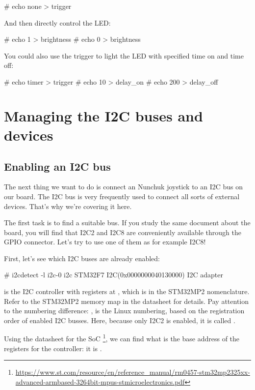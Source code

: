 {\begin{bashinput}
# echo none > trigger
\end{bashinput}

And then directly control the LED:

\begin{bashinput}
# echo 1 > brightness
# echo 0 > brightness
\end{bashinput}

You could also use the  trigger to light the LED
with specified time on and time off:

\begin{bashinput}
# echo timer > trigger
# echo 10 > delay_on
# echo 200 > delay_off
\end{bashinput}

\section{Managing the I2C buses and devices}

\subsection{Enabling an I2C bus}

The next thing we want to do is connect an Nunchuk joystick
to an I2C bus on our board. The I2C bus is very frequently used
to connect all sorts of external devices. That's why we're covering
it here.

The first task is to find a suitable bus. If you study the
same document about the board, you will find that I2C2 and I2C8 are
conveniently available through the GPIO connector. Let's try
to use one of them as for example I2C8!

First, let's see which I2C buses are already enabled:

\begin{bashinput}
# i2cdetect -l
i2c-0   i2c             STM32F7 I2C(0x0000000040130000)         I2C adapter
\end{bashinput}

 is the I2C controller with registers at
, which is  in the STM32MP2
nomenclature. Refer to the STM32MP2 memory map in the datasheet for
details. Pay attention to the numbering difference: ,
is the Linux numbering, based on the registration order
of enabled I2C busses. Here, because only I2C2 is enabled,
it is called .

Using the datasheet for the SoC
\footnote{\url{https://www.st.com/resource/en/reference_manual/rm0457-stm32mp2325xx-advanced-armbased-3264bit-mpus-stmicroelectronics.pdf}},
we can find what is the base address of the registers for the
 controller: it is .

}
